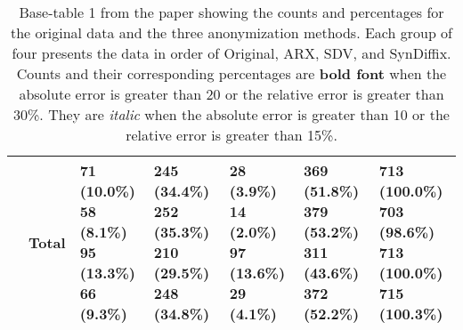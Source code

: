 \begin{table}
\begin{center}
\begin{small}
\begin{tabular}{lllllll}
& Total      & \makecell[l]{71 (10.0\%) \\58 (8.1\%) \\95 (13.3\%) \\66 (9.3\%) \\}      & \makecell[l]{245 (34.4\%) \\252 (35.3\%) \\210 (29.5\%) \\248 (34.8\%) \\}      & \makecell[l]{28 (3.9\%) \\14 (2.0\%) \\97 (13.6\%) \\29 (4.1\%) \\}      & \makecell[l]{369 (51.8\%) \\379 (53.2\%) \\311 (43.6\%) \\372 (52.2\%) \\}      & \makecell[l]{713 (100.0\%)  \\703 (98.6\%)  \\713 (100.0\%)  \\715 (100.3\%)  \\} \\ 

      \bottomrule
      \end{tabular}
      \end{small}
      \caption{Base-table 1 from the paper showing the counts and percentages for the original data and the three anonymization methods. Each group of four presents the data in order of Original, ARX, SDV, and SynDiffix. Counts and their corresponding percentages are \textbf{bold font} when the absolute error is greater than 20 or the relative error is greater than 30\%. They are \textit{italic} when the absolute error is greater than 10 or the relative error is greater than 15\%.}
      \label{tab:table1}
      \end{center}
      \end{table}
      \setlength{\fboxsep}{3pt}
    